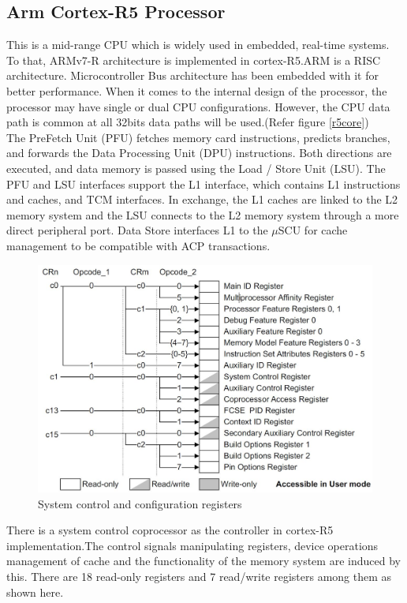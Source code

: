 \documentclass[a4paper,11pt]{article}
\begin{document}
\subsection{Arm Cortex-R5 Processor}
This is a mid-range CPU which is widely used in embedded, real-time systems. To that, ARMv7-R architecture is implemented in cortex-R5.ARM is a RISC architecture. Microcontroller Bus architecture has been embedded with it for better performance. When it comes to the internal design of the processor, the processor may have single or dual CPU configurations. However, the CPU data path is common at all 32bits data paths will be used\cite{TCLS}.(Refer figure \ref{r5core}) \\

The PreFetch Unit (PFU) fetches memory card instructions, predicts branches, and forwards the Data Processing Unit (DPU) instructions. Both directions are executed, and data memory is passed using the Load / Store Unit (LSU). The PFU and LSU interfaces support the L1 interface, which contains L1 instructions and caches, and TCM interfaces. In exchange, the L1 caches are linked to the L2 memory system and the LSU connects to the L2 memory system through a more direct peripheral port. Data Store interfaces L1 to the $\mu$SCU\cite{developer} for cache management to be compatible with ACP transactions.\\

\begin{figure}[!h]
	\centering
	\includegraphics[scale= 0.3]{figures/syscc}
	\caption{System control and configuration registers}
\end{figure}

There is a system control coprocessor as the controller in cortex-R5 implementation.The control signals manipulating registers, device operations management of cache and the functionality of the memory system are induced by this. There are 18 read-only registers and 7 read/write registers among them as shown here.
\end{document}
